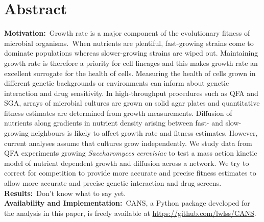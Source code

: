 \section*{Abstract}
\label{sec:abstract}

\textbf{Motivation:}~Growth rate is a major component of the
evolutionary fitness of microbial organisms.~When nutrients are
plentiful, fast-growing strains come to dominate populations whereas
slower-growing strains are wiped out. Maintaining growth rate is
therefore a priority for cell lineages and this makes growth rate an
excellent surrogate for the health of cells. Measuring the
health of cells grown in different genetic backgrounds or environments
can inform about genetic interaction and drug sensitivity. In
high-throughput procedures such as QFA and SGA, arrays of microbial
cultures are grown on solid agar plates and quantitative fitness
estimates are determined from growth measurements. Diffusion of
nutrients along gradients in nutrient density arising between fast-
and slow-growing neighbours is likely to affect growth rate and
fitness estimates. However, current analyses assume that cultures grow
independently. We study data from QFA experiments growing
\textit{Saccharomyces cerevisiae} to test a mass action kinetic model
of nutrient dependent growth and diffusion across a network. We try to
correct for competition to provide more accurate and precise fitness
estimates to allow more accurate and precise genetic interaction and
drug screens.
\\
\textbf{Results:}~Don't know what to say yet.\\
\textbf{Availability and Implementation:}~CANS, a Python package
developed for the analysis in this paper, is freely available at
\href{https://github.com/lwlss/CANS}{https://github.com/lwlss/CANS}.
